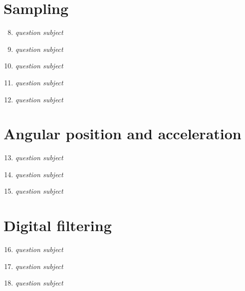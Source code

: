 \documentclass[a4paper,12pt]{article}
\begin{document}
\section{Sampling}
\begin{enumerate}[label={\color{blue}\arabic*)}]
  \setcounter{enumi}{7}
  \item \emph{question subject}
  \item \emph{question subject}
  \item \emph{question subject}
  \item \emph{question subject}
  \item \emph{question subject}
\end{enumerate}

\section{Angular position and acceleration}
\begin{enumerate}[label={\color{blue}\arabic*)}]
  \setcounter{enumi}{12}
  \item \emph{question subject}
  \item \emph{question subject}
  \item \emph{question subject}
\end{enumerate}

\section{Digital filtering}
\begin{enumerate}[label={\color{blue}\arabic*)}]
  \setcounter{enumi}{15}
  \item \emph{question subject}
  \item \emph{question subject}
  \item \emph{question subject}
\end{enumerate}
\end{document}

